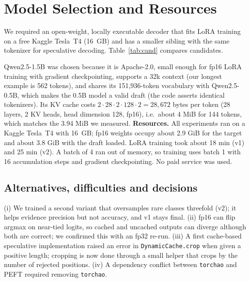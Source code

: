 \documentclass[conference]{IEEEtran}
\begin{document}
\section{Model Selection and Resources}
We required an open-weight, locally executable decoder that fits LoRA training on a free Kaggle Tesla~T4 (16~GB) and has a smaller sibling with the same tokenizer for speculative decoding. Table~\ref{tab:cand} compares candidates.
\begin{table}[t]\centering\caption{Candidate decoders (weights in fp16 $\approx 2$ bytes/parameter; Llama figures from its model card).}\label{tab:cand}\scriptsize
{}\end{table}
Qwen2.5-1.5B \cite{qwen25} was chosen because it is Apache-2.0, small enough for fp16 LoRA training with gradient checkpointing, supports a 32k context (our longest example is 562 tokens), and shares its 151{,}936-token vocabulary with Qwen2.5-0.5B, which makes the 0.5B model a valid draft (the code asserts identical tokenizers). Its KV cache costs $2\cdot 28\cdot 2\cdot 128\cdot 2=28{,}672$ bytes per token (28 layers, 2 KV heads, head dimension 128, fp16), i.e.\ about 4 MiB for 144 tokens, which matches the 3.94 MiB we measured.
\textbf{Resources.} All experiments ran on a Kaggle Tesla~T4 with 16~GB; fp16 weights occupy about 2.9 GiB for the target and about 3.8 GiB with the draft loaded. LoRA training took about 18 min (v1) and 25 min (v2). A batch of 4 ran out of memory, so training uses batch 1 with 16 accumulation steps and gradient checkpointing. No paid service was used.
\subsection{Alternatives, difficulties and decisions}
(i) We trained a second variant that oversamples rare classes threefold (v2); it helps evidence precision but not accuracy, and v1 stays final. (ii) fp16 can flip argmax on near-tied logits, so cached and uncached outputs can diverge although both are correct; we confirmed this with an fp32 re-run. (iii) A first cache-based speculative implementation raised an error in \texttt{DynamicCache.crop} when given a positive length; cropping is now done through a small helper that crops by the number of rejected positions. (iv) A dependency conflict between \texttt{torchao} and PEFT required removing \texttt{torchao}.
\end{document}
